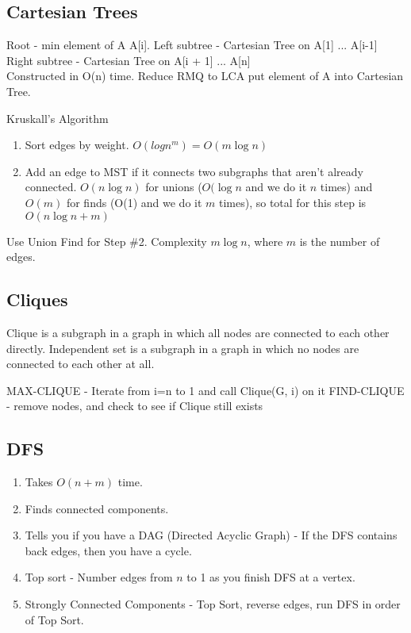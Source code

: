 \documentclass[10pt,twocolumn]{article}
\begin{document}
\subsection{Cartesian Trees}
Root - min element of A A[i].  Left subtree - Cartesian Tree on A[1] ... A[i-1]
Right subtree - Cartesian Tree on A[i + 1] ... A[n]\\
Constructed in O(n) time.
Reduce RMQ to LCA put element of A into Cartesian Tree.

Kruskall's Algorithm
\begin{enumerate}
    \item Sort edges by weight. $O(logn^m) = O(m\log{n})$
    \item Add an edge to MST if it connects two subgraphs that aren't already connected. $O(n\log{n})$ for
        unions ($O(\log{n}$ and we do it $n$ times) and $O(m)$ for finds (O(1) and we do it $m$ times), so total for this step is $O(n\log{n}+m)$
\end{enumerate}

Use Union Find for Step \#2. Complexity $m \log n$, where $m$ is the number of edges.

\subsection{Cliques}

Clique is a subgraph in a graph in which all nodes are connected to each other directly.
Independent set is a subgraph in a graph in which no nodes are connected to each other at all.

MAX-CLIQUE - Iterate from i=n to 1 and call Clique(G, i) on it
FIND-CLIQUE - remove nodes, and check to see if Clique still exists

\subsection{DFS}
\begin{enumerate}
    \item Takes $O(n+m)$ time.
    \item Finds connected components.
    \item Tells you if you have a DAG (Directed Acyclic Graph) - If the DFS contains back edges, then you have a cycle.
    \item Top sort - Number edges from $n$ to 1 as you finish DFS at a vertex.
    \item Strongly Connected Components - Top Sort, reverse edges, run DFS in order of Top Sort.
\end{enumerate}
\end{document}
